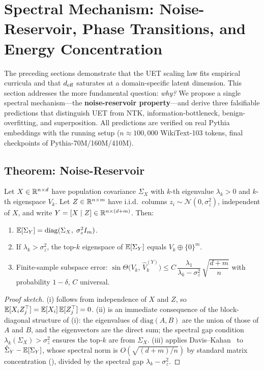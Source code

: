 \section{Spectral Mechanism: Noise-Reservoir, Phase Transitions, and
         Energy Concentration}
\label{sec:v5}

The preceding sections demonstrate that the UET scaling law fits empirical
curricula and that $d_{\mathrm{eff}}$ saturates at a domain-specific latent dimension.
This section addresses the more fundamental question: \emph{why?}
We propose a single spectral mechanism---the \textbf{noise-reservoir
property}---and derive three falsifiable predictions that distinguish UET
from NTK, information-bottleneck, benign-overfitting, and superposition.
All predictions are verified on real Pythia embeddings with the running
setup ($n \approx 100{,}000$ WikiText-103 tokens, final checkpoints of
Pythia-70M/160M/410M).

\subsection{Theorem: Noise-Reservoir}
\label{sec:nr-theorem}

\begin{theorem}\label{thm:nr}
Let $X \in \mathbb{R}^{n \times d}$ have population covariance $\Sigma_X$
with $k$-th eigenvalue $\lambda_k > 0$ and $k$-th eigenspace $V_k$.
Let $Z \in \mathbb{R}^{n \times m}$ have i.i.d.\ columns
$z_i \sim \mathcal{N}(0, \sigma_z^2)$, independent of $X$, and write
$Y = [X \mid Z] \in \mathbb{R}^{n \times (d+m)}$.
Then:
\begin{enumerate}[leftmargin=1.7em,itemsep=2pt]
  \item[(i)] $\mathbb{E}[\Sigma_Y] = \mathrm{diag}(\Sigma_X,\; \sigma_z^2 I_m)$.
  \item[(ii)] If $\lambda_k > \sigma_z^2$, the top-$k$ eigenspace of
        $\mathbb{E}[\Sigma_Y]$ equals $V_k \oplus \{0\}^m$.
  \item[(iii)] Finite-sample subspace error:
        $\sin\Theta\bigl(V_k,\, \hat V_k^{(Y)}\bigr) \leq
           C\,\dfrac{\lambda_1}{\lambda_k - \sigma_z^2}\,
              \sqrt{\dfrac{d+m}{n}}$
        with probability $1 - \delta$, $C$ universal.
\end{enumerate}
\end{theorem}

\begin{proof}[Proof sketch]
(i) follows from independence of $X$ and $Z$, so
$\mathbb{E}[X_i Z_j^\top] = \mathbb{E}[X_i]\,\mathbb{E}[Z_j^\top] = 0$.
(ii) is an immediate consequence of the block-diagonal structure of (i):
the eigenvalues of $\mathrm{diag}(A, B)$ are the union of those of $A$ and
$B$, and the eigenvectors are the direct sum; the spectral gap condition
$\lambda_k(\Sigma_X) > \sigma_z^2$ ensures the top-$k$ are from $\Sigma_X$.
(iii) applies Davis--Kahan~\citep{davis1970rotation} to
$\hat\Sigma_Y - \mathbb{E}[\Sigma_Y]$, whose spectral norm is
$O(\sqrt{(d+m)/n})$ by standard matrix concentration
(\citealp{nadler2009finite}), divided by the spectral gap
$\lambda_k - \sigma_z^2$.
\end{proof}


